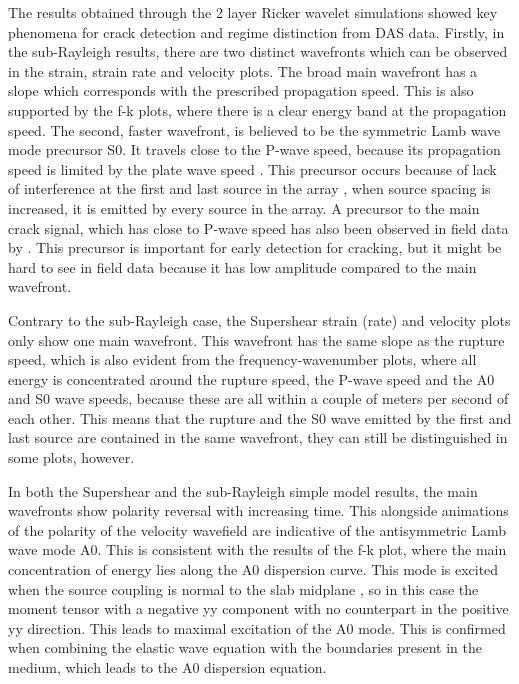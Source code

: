 The results obtained through the 2 layer Ricker wavelet simulations showed key phenomena for crack detection and regime distinction from DAS data. Firstly, in the sub-Rayleigh results, there are two distinct wavefronts which can be observed in the strain, strain rate and velocity plots. The broad main wavefront has a slope which corresponds with the prescribed propagation speed. This is also supported by the f-k plots, where there is a clear energy band at the propagation speed. The second, faster wavefront, is believed to be the symmetric Lamb wave mode precursor S0. It travels close to the P-wave speed, because its propagation speed is limited by the plate wave speed \parencite{roseWavesPlates2014}. This precursor occurs because of lack of interference at the first and last source in the array \parencite{madariagaDynamicsExpandingCircular1976}, when source spacing is increased, it is emitted by every source in the array. A precursor to the main crack signal, which has close to P-wave speed has also been observed in field data by \cite{herwijnenSeismicSensorArray2011}. This precursor is important for early detection for cracking, but it might be hard to see in field data because it has low amplitude compared to the main wavefront. \par 

Contrary to the sub-Rayleigh case, the Supershear strain (rate) and velocity plots only show one main wavefront. This wavefront has the same slope as the rupture speed, which is also evident from the frequency-wavenumber plots, where all energy is concentrated around the rupture speed, the P-wave speed and the A0 and S0 wave speeds, because these are all within a couple of meters per second of each other. This means that the rupture and the S0 wave emitted by the first and last source are contained in the same wavefront, they can still be distinguished in some plots, however. \par

In both the Supershear and the sub-Rayleigh simple model results, the main wavefronts show polarity reversal with increasing time. This alongside animations of the polarity of the velocity wavefield are indicative of the antisymmetric Lamb wave mode A0. This is consistent with the results of the f-k plot, where the main concentration of energy lies along the A0 dispersion curve. This mode is excited when the source coupling is normal to the slab midplane \parencite{roseWavesPlates2014}, so in this case the moment tensor with a negative yy component with no counterpart in the positive yy direction. This leads to maximal excitation of the A0 mode. This is confirmed when combining the elastic wave equation with the boundaries present in the medium, which leads to the A0 dispersion equation. \par 


